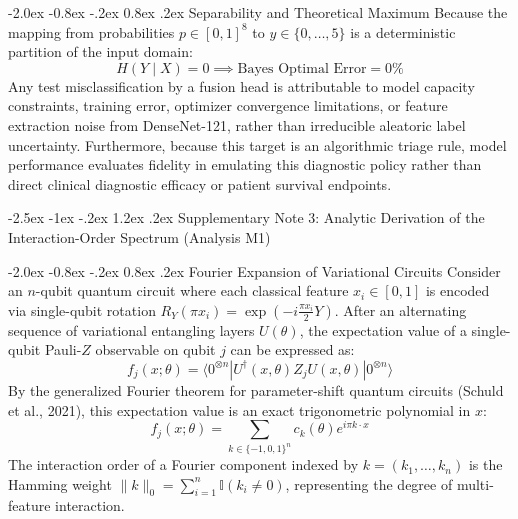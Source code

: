 \documentclass[10pt,a4paper]{article}
\makeatletter
\renewcommand{\section}{\@startsection{section}{1}{\z@}%
  {-2.5ex \@plus -1ex \@minus -.2ex}%
  {1.2ex \@plus.2ex}%
  {\normalfont\Large\sffamily\bfseries\color{naturedark}}}
\renewcommand{\subsection}{\@startsection{subsection}{2}{\z@}%
  {-2.0ex \@plus -0.8ex \@minus -.2ex}%
  {0.8ex \@plus.2ex}%
  {\normalfont\large\sffamily\bfseries\color{naturedark}}}
\makeatother
\begin{document}
\subsection{Separability and Theoretical Maximum}
Because the mapping from probabilities $p \in [0, 1]^8$ to $y \in \{0, \dots, 5\}$ is a deterministic partition of the input domain:
\begin{equation}
H(Y \mid X) = 0 \implies \text{Bayes Optimal Error} = 0\%
\end{equation}
Any test misclassification by a fusion head is attributable to model capacity constraints, training error, optimizer convergence limitations, or feature extraction noise from DenseNet-121, rather than irreducible aleatoric label uncertainty. Furthermore, because this target is an algorithmic triage rule, model performance evaluates fidelity in emulating this diagnostic policy rather than direct clinical diagnostic efficacy or patient survival endpoints.

\section{Supplementary Note 3: Analytic Derivation of the Interaction-Order Spectrum (Analysis M1)}

\subsection{Fourier Expansion of Variational Circuits}
Consider an $n$-qubit quantum circuit where each classical feature $x_i \in [0, 1]$ is encoded via single-qubit rotation $R_Y(\pi x_i) = \exp(-i \frac{\pi x_i}{2} Y)$. After an alternating sequence of variational entangling layers $U(\theta)$, the expectation value of a single-qubit Pauli-$Z$ observable on qubit $j$ can be expressed as:
\begin{equation}
f_j(x; \theta) = \langle 0^{\otimes n} | U^\dagger(x, \theta) Z_j U(x, \theta) | 0^{\otimes n} \rangle
\end{equation}
By the generalized Fourier theorem for parameter-shift quantum circuits (Schuld et al., 2021), this expectation value is an exact trigonometric polynomial in $x$:
\begin{equation}
f_j(x; \theta) = \sum_{k \in \{-1, 0, 1\}^n} c_k(\theta) e^{i \pi k \cdot x}
\end{equation}
The interaction order of a Fourier component indexed by $k = (k_1, \dots, k_n)$ is the Hamming weight $\lVert k \rVert_0 = \sum_{i=1}^n \mathbb{I}(k_i \ne 0)$, representing the degree of multi-feature interaction.
\end{document}
